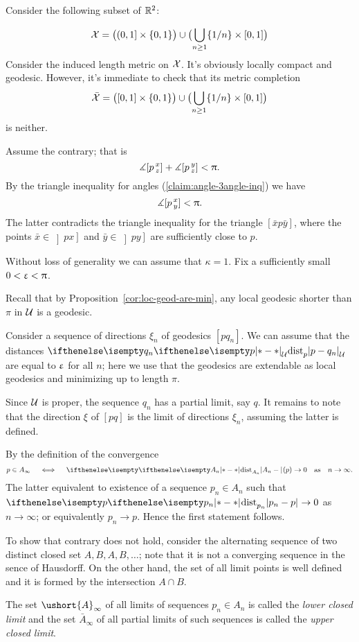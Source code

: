 Consider the following subset of $\mathbb{R}^2$:

\[
\spc{X}
=
\bigl((0,1]\times\{0,1\}\bigr)
\cup
\bigl(\bigcup_{n\ge 1}\{1/n\}\times[0,1]\bigr)
\]
Consider the induced length metric on $\mathcal{X}$. It's obviously locally compact and geodesic.
However, it's immediate to check that its metric completion \[\bar{\spc{X}}
=
\bigl([0,1]\times\{0,1\}\bigr)
\cup
\bigl(\bigcup_{n\ge 1}\{1/n\}\times[0,1]\bigr)\] 
is neither. \qeds 

Assume the contrary; that is
\[\measuredangle[p\,{}^{x}_{z}]+\measuredangle[p\,{}^{y}_{z}]< \uppi.\]
By the  triangle inequality for angles (\ref{claim:angle-3angle-inq})
we have 
\[\measuredangle[p\,{}^{x}_{y}]<\uppi.\]
The latter contradicts the triangle inequality for the triangle $[\bar x p \bar y]$,
where the points
$\bar x\in \left]px\right]$ and $\bar y\in \left]py\right]$
are sufficiently close to $p$.\qeds


Without loss of generality we can assume that $\kappa=1$.
Fix a sufficiently small $0<\upvarepsilon<\uppi$.

Recall that by Proposition~\ref{cor:loc-geod-are-min}, any local geodesic shorter than $\pi$ in  $\mathcal{U}$ is a geodesic.

Consider a sequence of directions $\xi_n$ of geodesics $[pq_n]$.
We can assume that the distances $\dist{p}{q_n}{\spc{U}}$ are equal to $\upvarepsilon$ for all $n$;
here we use that the geodesics are extendable as local geodesics and minimizing up to length $\pi$.

Since $\mathcal{U}$ is proper,
the sequence $q_n$ has a partial limit, say $q$.
It remains to note that the direction $\xi$ of $[pq]$ is the limit of directions $\xi_n$,
assuming the latter is defined.\qeds

By the definition of the convergence
\[p\in A_\infty\quad\iff\quad\dist{A_n}{}{}(p)\to 0\quad\text{as}\quad n\to \infty.\] 
The latter equivalent to existence of a sequence $p_n\in A_n$ such that
$\dist{p_n}{p}{}\to0$ as $n\to \infty$;
or equivalently $p_n\to p$.
Hence the first statement follows.

To show that contrary does not hold,
consider the alternating sequence of two distinct closed set $A,B,A,B,\dots$;
note that it is not a converging sequence in the sence of Hausdorff.
On the other hand, the set of all limit points is well defined and it is formed by the intersection $A\cap B$.\qeds

 The set $\ushort{A}_\infty$ of all limits  of sequences $p_n\in A_n$ is called the \emph{lower closed limit}
and the set $\bar{A}_\infty$ of all partial limits of such sequences is called the \emph{upper closed limit}.

